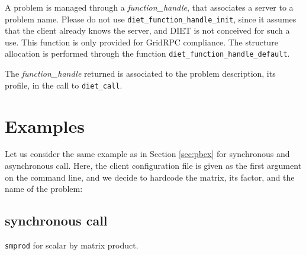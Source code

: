 A problem is managed through a \emph{function\_handle}, that
associates a server to a problem name. Please do not use
\texttt{diet\_function\_handle\_init}, since it assumes that the
client already knows the server, and DIET is not conceived for such a
use. This function is only provided for GridRPC compliance. The
structure allocation is performed through the function
\texttt{diet\_function\_handle\_default}.

The \emph{function\_handle} returned is associated to the problem description,
its profile, in the call to \texttt{diet\_call}.

\section{Examples}
\label{sec:cl_ex}

Let us consider the same example as in Section \ref{sec:pbex} for synchronous 
and asynchronous call.  Here, the client configuration file is given as the 
first argument on the command line, and we decide to hardcode the matrix,
its factor, and the name of the problem:

\subsection{synchronous call}
\texttt{smprod}
for scalar by matrix product.

